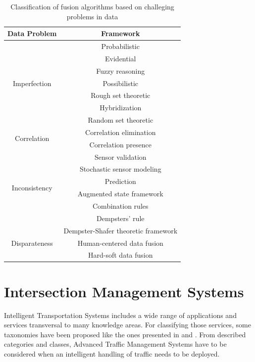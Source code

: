 \begin{table}[ht!]
\footnotesize
\centering
\begin{tabular}{|c|c|}
\hline
\textbf{Data Problem} & \textbf{Framework} \\
\hline
\multirow{7}{*}{Imperfection} & Probabilistic \\
& Evidential \\
& Fuzzy reasoning \\
& Possibilistic \\
& Rough set theoretic \\
& Hybridization \\
& Random set theoretic \\
\hline
\multirow{2}{*}{Correlation} & Correlation elimination \\
& Correlation presence \\
\hline
\multirow{6}{*}{Inconsistency} & Sensor validation \\
& Stochastic sensor modeling\\
& Prediction \\
& Augmented state framework \\
& Combination rules \\
& Dempsters' rule \\
\hline
\multirow{3}{*}{Disparateness} & Dempster-Shafer theoretic framework \\
& Human-centered data fusion \\
& Hard-soft data fusion \\
\hline
\end{tabular}
\caption{Classification of fusion algorithms based on challeging problems in data}
\label{fusionAlgClasKhaleghi}
\end{table}


\section{Intersection Management Systems}

Intelligent Transportation Systems includes a wide range of applications and services transversal to many knowledge areas. For classifying those services, some taxonomies have been proposed like the ones presented in \cite[Ch.1]{Sussman2005} and \cite{Williams2008}. From described categories and classes, Advanced Traffic Management Systems have to be considered when an intelligent handling of traffic needs to be deployed.

